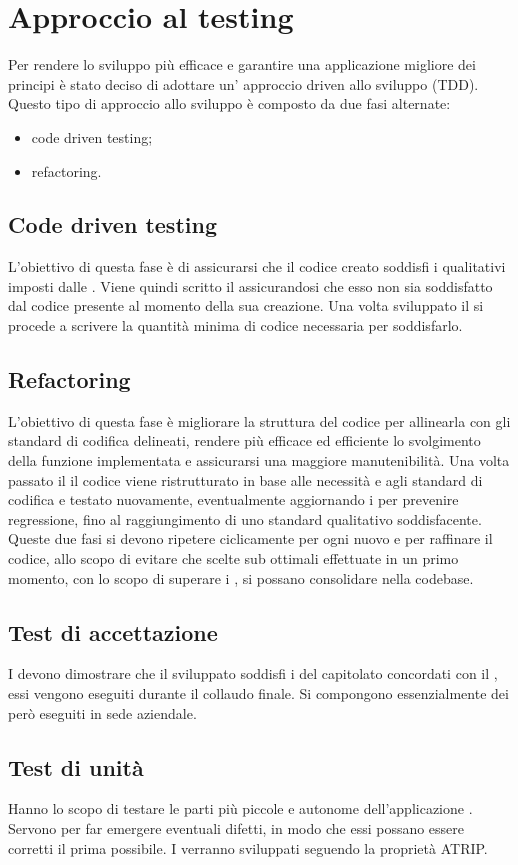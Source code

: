 \section{Approccio al testing}
Per rendere lo sviluppo più efficace e garantire una applicazione migliore dei principi  è stato deciso di adottare un' approccio  driven allo sviluppo (TDD). \\
Questo tipo di approccio allo sviluppo è composto da due fasi alternate:
\begin{itemize}
\item code driven testing;
\item refactoring.
\end{itemize}
\subsection{Code driven testing}
L'obiettivo di questa fase è di assicurarsi che il codice creato soddisfi i  qualitativi imposti dalle . Viene quindi scritto il  assicurandosi che esso non sia soddisfatto dal codice presente al momento della sua creazione. Una volta sviluppato il  si procede a scrivere la quantità minima di codice necessaria per soddisfarlo.
\subsection{Refactoring}
L'obiettivo di questa fase è migliorare la struttura del codice per allinearla con gli standard di codifica delineati, rendere più efficace ed efficiente lo svolgimento della funzione implementata e assicurarsi una maggiore manutenibilità. Una volta passato il  il codice viene ristrutturato in base alle necessità e agli standard di codifica e testato nuovamente, eventualmente aggiornando i  per prevenire regressione, fino al raggiungimento di uno standard qualitativo soddisfacente. \newline{}
\newline{}
Queste due fasi si devono ripetere ciclicamente per ogni nuovo  e per raffinare il codice, allo scopo di evitare che scelte sub ottimali effettuate in un primo momento, con lo scopo di superare i , si possano consolidare nella codebase.


\subsection{Test di accettazione}
I  devono dimostrare che il  sviluppato soddisfi i  del capitolato concordati con il , essi vengono eseguiti durante il collaudo finale.
Si compongono essenzialmente dei  però eseguiti in sede aziendale.

\subsection{Test di unità}
Hanno lo scopo di testare le parti più piccole e autonome dell'applicazione . Servono per far emergere eventuali difetti, in modo che essi possano essere corretti il prima possibile.
I  verranno sviluppati seguendo la proprietà ATRIP.